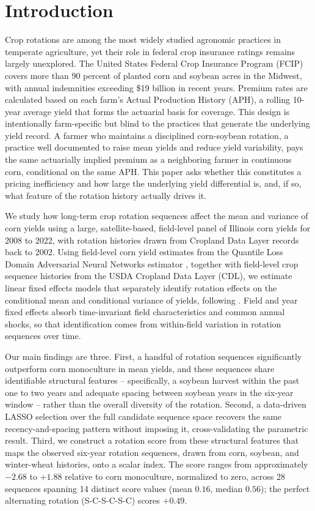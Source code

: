 \documentclass[12pt,letterpaper]{article}
\theoremstyle{remark}
\theoremstyle{remark}
\theoremstyle{plain}
\theoremstyle{definition}
\begin{document}
\newpage
\setcounter{page}{1}

\section{\label{sec:intro}Introduction}

Crop rotations are among the most widely studied agronomic practices in temperate agriculture, yet their role in federal crop insurance ratings remains largely unexplored. The United States Federal Crop Insurance Program (FCIP) covers more than 90 percent of planted corn and soybean acres in the Midwest, with annual indemnities exceeding \$19 billion in recent years. Premium rates are calculated based on each farm's Actual Production History (APH), a rolling 10-year average yield that forms the actuarial basis for coverage. This design is intentionally farm-specific but blind to the practices that generate the underlying yield record. A farmer who maintains a disciplined corn-soybean rotation, a practice well documented to raise mean yields and reduce yield variability, pays the same actuarially implied premium as a neighboring farmer in continuous corn, conditional on the same APH. This paper asks whether this constitutes a pricing inefficiency and how large the underlying yield differential is, and, if so, what feature of the rotation history actually drives it.

We study how long-term crop rotation sequences affect the mean and variance of corn yields using a large, satellite-based, field-level panel of Illinois corn yields for 2008 to 2022, with rotation histories drawn from Cropland Data Layer records back to 2002. Using field-level corn yield estimates from the Quantile Loss Domain Adversarial Neural Networks estimator \citep[QDANN;][]{Ma2024}, together with field-level crop sequence histories from the USDA Cropland Data Layer (CDL), we estimate linear fixed effects models that separately identify rotation effects on the conditional mean and conditional variance of yields, following \citet{Just1979}. Field and year fixed effects absorb time-invariant field characteristics and common annual shocks, so that identification comes from within-field variation in rotation sequences over time.

Our main findings are three. First, a handful of rotation sequences significantly outperform corn monoculture in mean yields, and these sequences share identifiable structural features -- specifically, a soybean harvest within the past one to two years and adequate spacing between soybean years in the six-year window -- rather than the overall diversity of the rotation. Second, a data-driven LASSO selection over the full candidate sequence space recovers the same recency-and-spacing pattern without imposing it, cross-validating the parametric result. Third, we construct a rotation score from these structural features that maps the observed six-year rotation sequences, drawn from corn, soybean, and winter-wheat histories, onto a scalar index. The score ranges from approximately $-2.68$ to $+1.88$ relative to corn monoculture, normalized to zero, across 28 sequences spanning 14 distinct score values (mean $0.16$, median $0.56$); the perfect alternating rotation (S-C-S-C-S-C) scores $+0.49$.
\end{document}
